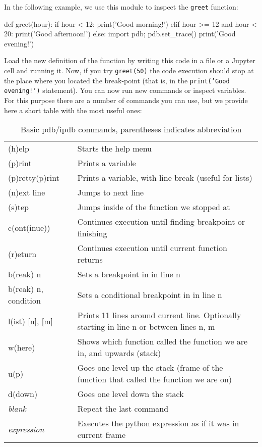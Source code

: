 \noindent In the following example, we use this module to inspect the \texttt{greet} function:

\begin{python}
def greet(hour):
    if hour < 12:
        print('Good morning!')
    elif hour >= 12 and hour < 20:
        print('Good afternoon!')
    else:
        import pdb; pdb.set_trace()
        print('Good evening!')
\end{python}

Load the new definition of the function by writing this code in a file or a Jupyter cell and running it. Now, if you try \texttt{greet(50)} the code execution should stop at the place where you located the break-point (that is, in the \texttt{print('Good evening!')} statement). You can now run new commands or inspect variables. For this purpose there are a number of commands you can use\footnotemark{}, but we provide here a short table with the most useful ones: 

\begin{table}[!h]
\begin{center}
\begin{tabular}{|l|l|}
\hline
(h)elp           & Starts the help menu\\
(p)rint          & Prints a variable\\
(p)retty(p)rint	 & Prints a variable, with line break (useful for lists)\\
\hline
(n)ext line      & Jumps to next line\\ 
(s)tep           & Jumps inside of the function we stopped at\\
c(ont(inue))     & Continues execution until finding breakpoint or finishing\\
(r)eturn         & Continues execution until current function returns\\
b(reak) n        & Sets a breakpoint in in line n\\
b(reak) n, condition  & Sets a conditional breakpoint in in line n\\
\hline
l(ist) [n], [m]  & Prints 11 lines around current line. Optionally starting in line n or between lines n, m\\
w(here)          & Shows which function called the function we are in, and upwards (stack)\\
u(p)             & Goes one level up the stack (frame of the function that called the function we are on)\\
d(down)          & Goes one level down the stack\\
\hline
\textit{blank}          & Repeat the last command\\ 
\textit{expression}     & Executes the python expression as if it was in current frame\\
\hline
\end{tabular}
\end{center}
\caption{\label{tb::pdbbasiccommands}Basic pdb/ipdb commands, parentheses indicates abbreviation}
\end{table}

